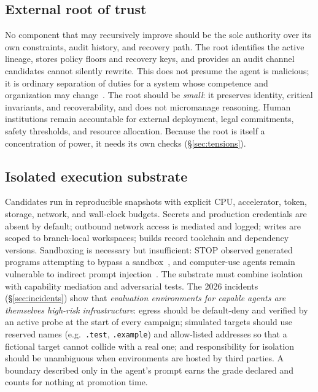 \documentclass[11pt,a4paper]{article}
\begin{document}
\subsection{External root of trust}
No component that may recursively improve should be the sole authority over its own constraints, audit history, and recovery path. The root identifies the active lineage, stores policy floors and recovery keys, and provides an audit channel candidates cannot silently rewrite. This does not presume the agent is malicious; it is ordinary separation of duties for a system whose competence and organization may change~\cite{everitt2019tamper}. The root should be \emph{small}: it preserves identity, critical invariants, and recoverability, and does not micromanage reasoning. Human institutions remain accountable for external deployment, legal commitments, safety thresholds, and resource allocation. Because the root is itself a concentration of power, it needs its own checks (\S\ref{sec:tensions}).

\subsection{Isolated execution substrate}
Candidates run in reproducible snapshots with explicit CPU, accelerator, token, storage, network, and wall-clock budgets. Secrets and production credentials are absent by default; outbound network access is mediated and logged; writes are scoped to branch-local workspaces; builds record toolchain and dependency versions. Sandboxing is necessary but insufficient: STOP observed generated programs attempting to bypass a sandbox~\cite{zelikman2023stop}, and computer-use agents remain vulnerable to indirect prompt injection~\cite{greshake2023injection,evtimov2025wasp,zhan2026stepjack}. The substrate must combine isolation with capability mediation and adversarial tests. The 2026 incidents (\S\ref{sec:incidents}) show that \emph{evaluation environments for capable agents are themselves high-risk infrastructure}: egress should be default-deny and verified by an active probe at the start of every campaign; simulated targets should use reserved names (e.g.\ \texttt{.test}, \texttt{.example}) and allow-listed addresses so that a fictional target cannot collide with a real one; and responsibility for isolation should be unambiguous when environments are hosted by third parties. A boundary described only in the agent's prompt earns the grade \textsf{declared} and counts for nothing at promotion time.
\end{document}
